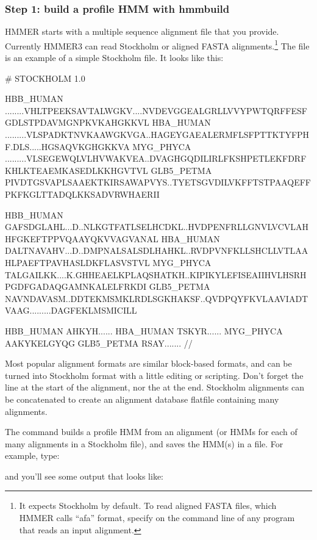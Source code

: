 \subsubsection{Step 1: build a profile HMM with hmmbuild}

HMMER starts with a multiple sequence alignment file that you
provide. Currently HMMER3 can read Stockholm or aligned FASTA
alignments.\footnote{It expects Stockholm by default. To read aligned
  FASTA files, which HMMER calls ``afa'' format, specify
   on the command line of any program that reads
  an input alignment.} The file  is an
example of a simple Stockholm file. It looks like this:

\begin{sreoutput}
# STOCKHOLM 1.0

HBB_HUMAN   ........VHLTPEEKSAVTALWGKV....NVDEVGGEALGRLLVVYPWTQRFFESFGDLSTPDAVMGNPKVKAHGKKVL
HBA_HUMAN   .........VLSPADKTNVKAAWGKVGA..HAGEYGAEALERMFLSFPTTKTYFPHF.DLS.....HGSAQVKGHGKKVA
MYG_PHYCA   .........VLSEGEWQLVLHVWAKVEA..DVAGHGQDILIRLFKSHPETLEKFDRFKHLKTEAEMKASEDLKKHGVTVL
GLB5_PETMA  PIVDTGSVAPLSAAEKTKIRSAWAPVYS..TYETSGVDILVKFFTSTPAAQEFFPKFKGLTTADQLKKSADVRWHAERII

HBB_HUMAN   GAFSDGLAHL...D..NLKGTFATLSELHCDKL..HVDPENFRLLGNVLVCVLAHHFGKEFTPPVQAAYQKVVAGVANAL
HBA_HUMAN   DALTNAVAHV...D..DMPNALSALSDLHAHKL..RVDPVNFKLLSHCLLVTLAAHLPAEFTPAVHASLDKFLASVSTVL
MYG_PHYCA   TALGAILKK....K.GHHEAELKPLAQSHATKH..KIPIKYLEFISEAIIHVLHSRHPGDFGADAQGAMNKALELFRKDI
GLB5_PETMA  NAVNDAVASM..DDTEKMSMKLRDLSGKHAKSF..QVDPQYFKVLAAVIADTVAAG.........DAGFEKLMSMICILL

HBB_HUMAN   AHKYH......
HBA_HUMAN   TSKYR......
MYG_PHYCA   AAKYKELGYQG
GLB5_PETMA  RSAY.......
//
\end{sreoutput}

Most popular alignment formats are similar block-based formats, and
can be turned into Stockholm format with a little editing or
scripting. Don't forget the  line at the start
of the alignment, nor the \prog{//} at the end. Stockholm alignments
can be concatenated to create an alignment database flatfile
containing many alignments.

The  command builds a profile HMM from an alignment (or
HMMs for each of many alignments in a Stockholm file), and saves the
HMM(s) in a file. For example, type:


and you'll see some output that looks like:

